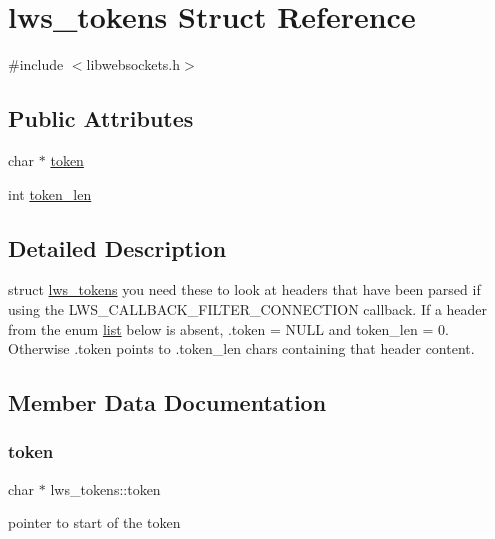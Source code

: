 \hypertarget{structlws__tokens}{}\section{lws\+\_\+tokens Struct Reference}
\label{structlws__tokens}


{\ttfamily \#include $<$libwebsockets.\+h$>$}

\subsection*{Public Attributes}
\begin{DoxyCompactItemize}
\item 
char $\ast$ \hyperlink{structlws__tokens_aca1aca7a0307271417828ed63832a724}{token}
\item 
int \hyperlink{structlws__tokens_a855b7375d1d58516c0ecd4b60e9a7766}{token\+\_\+len}
\end{DoxyCompactItemize}


\subsection{Detailed Description}
struct \hyperlink{structlws__tokens}{lws\+\_\+tokens} you need these to look at headers that have been parsed if using the L\+W\+S\+\_\+\+C\+A\+L\+L\+B\+A\+C\+K\+\_\+\+F\+I\+L\+T\+E\+R\+\_\+\+C\+O\+N\+N\+E\+C\+T\+I\+ON callback. If a header from the enum \hyperlink{protocollist-p}{list} below is absent, .token = N\+U\+LL and token\+\_\+len = 0. Otherwise .token points to .token\+\_\+len chars containing that header content. 

\subsection{Member Data Documentation}
\mbox{\label{structlws__tokens_aca1aca7a0307271417828ed63832a724}} 
\subsubsection{\texorpdfstring{token}{token}}
{\footnotesize\ttfamily char $\ast$ lws\+\_\+tokens\+::token}

pointer to start of the token \mbox{\label{structlws__tokens_a855b7375d1d58516c0ecd4b60e9a7766}} 
